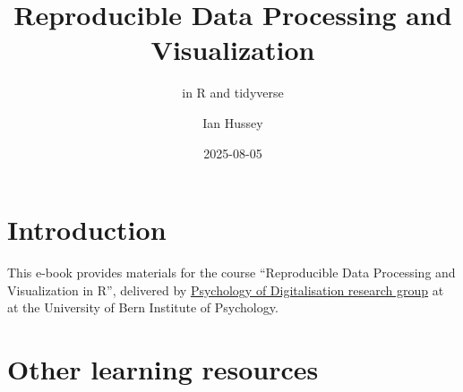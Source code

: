 \documentclass[
  letterpaper,
  DIV=11,
  numbers=noendperiod]{scrreprt}
\title{Reproducible Data Processing and Visualization}
\subtitle{in R and tidyverse}
\author{Ian Hussey}
\date{2025-08-05}
\renewcommand*\contentsname{Table of contents}
\newcommand\contentsname{Table of contents}
\begin{document}
\maketitle

\renewcommand*\contentsname{Table of contents}
{
\hypersetup{linkcolor=}
\setcounter{tocdepth}{2}
\tableofcontents
}


\chapter*{Introduction}\label{introduction}


This e-book provides materials for the course ``Reproducible Data
Processing and Visualization in R'', delivered by
\href{https://www.dig.psy.unibe.ch/}{Psychology of Digitalisation
research group} at at the University of Bern Institute of Psychology.


\chapter{Other learning resources}\label{other-learning-resources}
\end{document}
